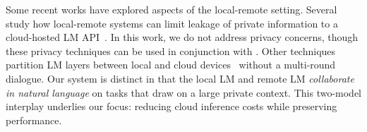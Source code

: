 Some recent works have explored aspects of the local-remote setting.
Several study how local-remote systems can limit leakage of private information to a cloud-hosted LM API~\citep{siyan2024papillon, zhang2024cogenesis}. 
In this work, we do not address privacy concerns, though these privacy techniques 
can be used in conjunction with \system.
Other techniques partition LM layers between local and cloud devices~\citep{jin2024collm, yang2024perllm} without a multi-round dialogue. Our system is distinct in that the local LM and remote LM \emph{collaborate in natural language} on tasks that draw on a large private context. This two-model interplay underlies our focus: reducing cloud inference costs while preserving performance.












